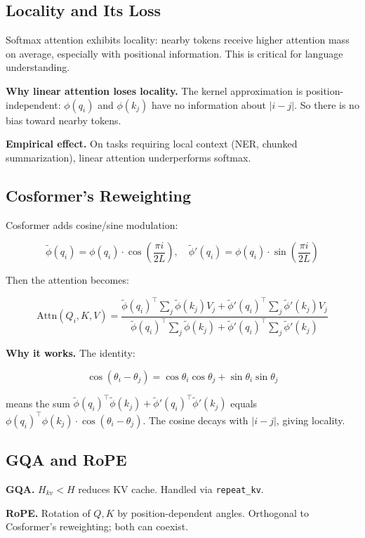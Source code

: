 \subsection{Locality and Its Loss}

Softmax attention exhibits locality: nearby tokens receive higher attention 
mass on average, especially with positional information. This is critical 
for language understanding.

\textbf{Why linear attention loses locality.} The kernel approximation is 
position-independent: $\phi(q_i)$ and $\phi(k_j)$ have no information about 
$|i - j|$. So there is no bias toward nearby tokens.

\textbf{Empirical effect.} On tasks requiring local context (NER, chunked 
summarization), linear attention underperforms softmax.

\subsection{Cosformer's Reweighting}

Cosformer adds cosine/sine modulation:

\[
\tilde{\phi}(q_i) = \phi(q_i) \cdot \cos\!\left(\frac{\pi i}{2 L}\right), \quad
\tilde{\phi}'(q_i) = \phi(q_i) \cdot \sin\!\left(\frac{\pi i}{2 L}\right)
\]

Then the attention becomes:

\[
\text{Attn}(Q_i, K, V) = \frac{\tilde{\phi}(q_i)^\top \sum_j \tilde{\phi}(k_j) V_j + \tilde{\phi}'(q_i)^\top \sum_j \tilde{\phi}'(k_j) V_j}{\tilde{\phi}(q_i)^\top \sum_j \tilde{\phi}(k_j) + \tilde{\phi}'(q_i)^\top \sum_j \tilde{\phi}'(k_j)}
\]

\textbf{Why it works.} The identity:

\[
\cos(\theta_i - \theta_j) = \cos\theta_i \cos\theta_j + \sin\theta_i \sin\theta_j
\]

means the sum $\tilde{\phi}(q_i)^\top \tilde{\phi}(k_j) + \tilde{\phi}'(q_i)^\top \tilde{\phi}'(k_j)$ 
equals $\phi(q_i)^\top \phi(k_j) \cdot \cos(\theta_i - \theta_j)$. The 
cosine decays with $|i - j|$, giving locality.

\subsection{GQA and RoPE}

\textbf{GQA.} $H_{kv} < H$ reduces KV cache. Handled via \texttt{repeat\_kv}.

\textbf{RoPE.} Rotation of $Q, K$ by position-dependent angles. Orthogonal to 
Cosformer's reweighting; both can coexist.


